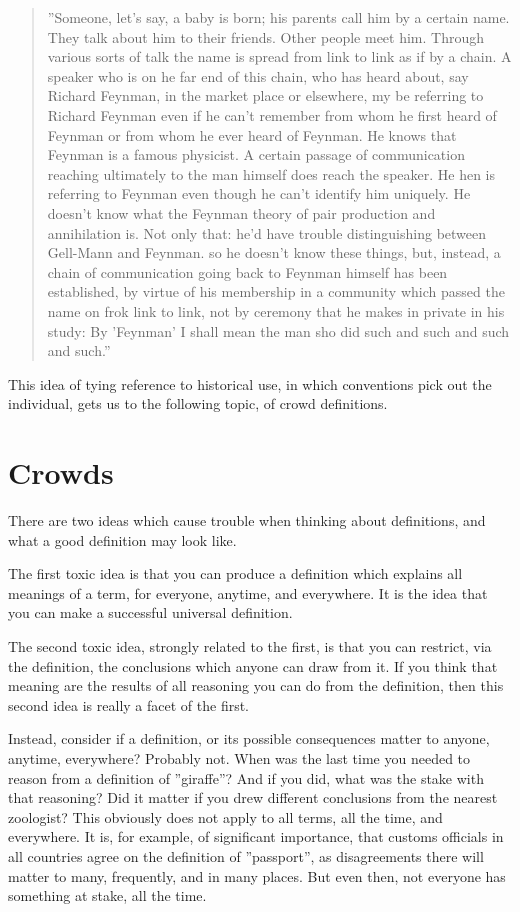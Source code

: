 \documentclass[graybox,envcountchap,sectrefs]{svmono}
\begin{document}
\begin{quote}
''Someone, let's say, a baby is born; his parents call him by a certain name. They talk about him to their friends. Other people meet him. Through various sorts of talk the name is spread from link to link as if by a chain. A speaker who is on he far end of this chain, who has heard about, say Richard Feynman, in the market place or elsewhere, my be referring to Richard Feynman even if he can't remember from whom he first heard of Feynman or from whom he ever heard of Feynman. He knows that Feynman is a famous physicist. A certain passage of communication reaching ultimately to the man himself does reach the speaker. He hen is referring to Feynman even though he can't identify him uniquely. He doesn't know what the Feynman theory of pair production and annihilation is. Not only that: he'd have trouble distinguishing between Gell-Mann and Feynman. so he doesn't know these things, but, instead, a chain of communication going back to Feynman himself has been established, by virtue of his membership in a community which passed the name on frok link to link, not by ceremony that he makes in private in his study: By 'Feynman' I shall mean the man sho did such and such and such and such.'' \cite{kripke1972naming}
\end{quote}

This idea of tying reference to historical use, in which conventions pick out the individual, gets us to the following topic, of crowd definitions.


\section{Crowds}
\label{c4:s6}
There are two ideas which cause trouble when thinking about definitions, and what a good definition may look like.

The first toxic idea is that you can produce a definition which explains all meanings of a term, for everyone, anytime, and everywhere. It is the idea that you can make a successful universal definition.

The second toxic idea, strongly related to the first, is that you can restrict, via the definition, the conclusions which anyone can draw from it. If you think that meaning are the results of all reasoning you can do from the definition, then this second idea is really a facet of the first.

Instead, consider if a definition, or its possible consequences matter to anyone, anytime, everywhere? Probably not. When was the last time you needed to reason from a definition of ''giraffe''? And if you did, what was the stake with that reasoning? Did it matter if you drew different conclusions from the nearest zoologist? This obviously does not apply to all terms, all the time, and everywhere. It is, for example, of significant importance, that customs officials in all countries agree on the definition of ''passport'', as disagreements there will matter to many, frequently, and in many places. But even then, not everyone has something at stake, all the time. 
\end{document}
